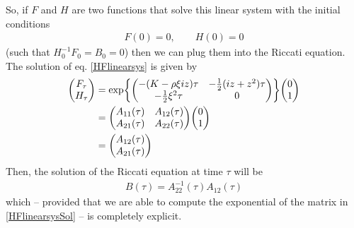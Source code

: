 So, if $F$ and $H$ are two functions that solve this linear system with the initial conditions
\begin{align}
    F(0) = 0, \qquad H(0) = 0
\end{align}
(such that $H_0^{-1}F_0=B_0=0$) then we can plug them into the Riccati equation. The solution of eq. \eqref{HFlinearsys} is given by
\begin{align}\label{HFlinearsysSol}
    \mqty(F_{\tau} \\ H_{\tau}) &= \exp{\mqty(-(K-\rho\xi iz)\tau & - \frac{1}{2}(iz+z^2)\tau \\ -\tfrac{1}{2}\xi^2\tau & 0)}\mqty(0\\1) \\
    &=
    \notag\mqty(A_{11}(\tau) & A_{12}(\tau) \\ A_{21}(\tau) & A_{22}(\tau))\mqty(0\\1) \\
    &=
    \notag\mqty(A_{12}(\tau) \\ A_{21}(\tau))
\end{align}
Then, the solution of the Riccati equation at time $\tau$ will be
\begin{eqnarray}
    B(\tau) = A_{22}^{-1}(\tau) A_{12}(\tau)
\end{eqnarray}
which -- provided that we are able to compute the exponential of the matrix in \eqref{HFlinearsysSol} -- is completely explicit. %
